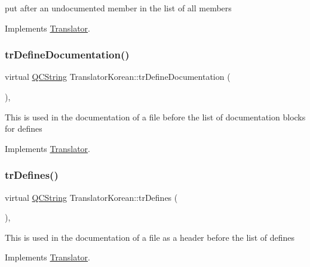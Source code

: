put after an undocumented member in the list of all members 

Implements \mbox{\hyperlink{class_translator}{Translator}}.

\mbox{\label{class_translator_korean_ade2b771872af0732662d65985c5b7880}} 
\subsubsection{\texorpdfstring{trDefineDocumentation()}{trDefineDocumentation()}}
{\footnotesize\ttfamily virtual \mbox{\hyperlink{class_q_c_string}{Q\+C\+String}} Translator\+Korean\+::tr\+Define\+Documentation (\begin{DoxyParamCaption}{ }\end{DoxyParamCaption})\hspace{0.3cm}{\ttfamily [inline]}, {\ttfamily [virtual]}}

This is used in the documentation of a file before the list of documentation blocks for defines 

Implements \mbox{\hyperlink{class_translator}{Translator}}.

\mbox{\label{class_translator_korean_a8b5d03487d482043a7c87d2f7bad1a56}} 
\subsubsection{\texorpdfstring{trDefines()}{trDefines()}}
{\footnotesize\ttfamily virtual \mbox{\hyperlink{class_q_c_string}{Q\+C\+String}} Translator\+Korean\+::tr\+Defines (\begin{DoxyParamCaption}{ }\end{DoxyParamCaption})\hspace{0.3cm}{\ttfamily [inline]}, {\ttfamily [virtual]}}

This is used in the documentation of a file as a header before the list of defines 

Implements \mbox{\hyperlink{class_translator}{Translator}}.

\mbox{\label{class_translator_korean_a4dd19b3883ff980ba96f7c337717e966}} 
